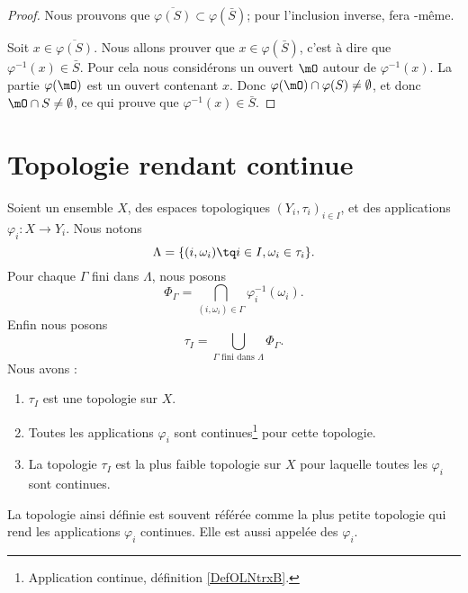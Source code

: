 \begin{proof}
	Nous prouvons que \( \overline{\varphi(S)}\subset\varphi(\bar S)\); pour l'inclusion inverse,  fera -même.

	Soit \( x\in\overline{\varphi(S)}\). Nous allons prouver que \( x\in\varphi(\bar S)\), c'est à dire que \( \varphi^{-1}(x)\in \bar S\). Pour cela nous considérons un ouvert \( \mO\) autour de \( \varphi^{-1}(x)\). La partie \( \varphi(\mO)\) est un ouvert contenant \( x\). Donc \( \varphi(\mO)\cap\varphi(S)\neq \emptyset\), et donc \( \mO\cap S\neq\emptyset\), ce qui prouve que \( \varphi^{-1}(x)\in\bar S\).
\end{proof}

\section{Topologie rendant continue}

\begin{propositionDef}     \label{PROPooGOEVooZBAOQh}
	Soient un ensemble \( X\), des espaces topologiques \( (Y_i,\tau_i)_{i\in I}\), et des applications \( \varphi_i\colon X\to Y_i\). Nous notons
	\begin{equation}
		\Lambda=\{ (i,\omega_i)\tq i\in I, \omega_i\in \tau_i \}.
	\end{equation}
	Pour chaque \( \Gamma\) fini dans \( \Lambda\), nous posons
	\begin{equation}
		\Phi_{\Gamma}=\bigcap_{(i,\omega_i)\in \Gamma}\varphi_i^{-1}(\omega_i).
	\end{equation}
	Enfin nous posons
	\begin{equation}
		\tau_I=\bigcup_{\Gamma\text{ fini dans } \Lambda}\Phi_{\Gamma}.
	\end{equation}
	Nous avons :
	\begin{enumerate}
		\item
		      \( \tau_I\) est une topologie sur \( X\).
		\item
		      Toutes les applications \( \varphi_i\) sont continues\footnote{Application continue, définition \ref{DefOLNtrxB}.} pour cette topologie.
		\item
		      La topologie \( \tau_I\) est la plus faible topologie sur \( X\) pour laquelle toutes les \( \varphi_i\) sont continues.
	\end{enumerate}

	La topologie ainsi définie est souvent référée comme la plus petite topologie qui rend les applications \( \varphi_i\) continues. Elle est aussi appelée  des \( \varphi_i\).
\end{propositionDef}

